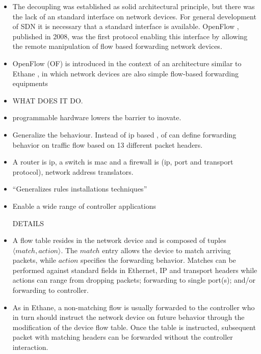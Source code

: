 \begin{itemize}
\begin{itemize}
\item The decoupling was established as solid architectural principle, but there was the lack of an standard interface on network devices. 
For general development of SDN  it is  necessary that a
standard interface is available. OpenFlow \cite{openflow}, published
in 2008,  was the first protocol enabling this interface by allowing
the remote manipulation of flow based forwarding network devices. 

\item OpenFlow (OF) is introduced in the context of an architecture similar to
Ethane \cite{Casado:2007kb}, in which network devices 
are also simple flow-based forwarding equipments 

\item WHAT DOES IT DO.
\item programmable hardware lowers the barrier to inovate. 
\item Generalize the behaviour. Instead of ip based , \gls{of} can define forwarding behavior on traffic flow based on 13 different packet headers. 
\item A router is ip, a switch is mac and a firewall is (ip, port and transport protocol), network address translators. 
\item ``Generalizes rules installations techniques'' 

\item  Enable a wide range of controller applications

DETAILS 
\item A flow
table resides in the network device and is composed of tuples
$\langle match,action \rangle$. The $match$ entry allows the device to match
arriving packets, while  $action$
specifies the forwarding behavior. Matches can be performed against
standard fields in Ethernet, IP and transport headers while actions can
range from dropping packets; forwarding to single port(s); and/or forwarding to controller. 


\item As in Ethane, a non-matching flow is usually forwarded to the controller who in
turn should instruct  the network device on future behavior through
the modification of the device flow table. Once the table is instructed, 
subsequent packet with matching headers can be forwarded without
the controller interaction. 



\end{itemize}
\end{itemize}
